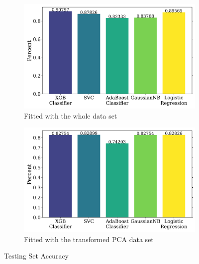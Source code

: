 \documentclass{article}
\begin{document}
\begin{figure}[H]
    \centering
    \begin{subfigure}[t]{0.495\textwidth}
        \centering
        \includegraphics[width=\textwidth]{supporting_images/test_acc_notpca.png}
        \caption{Fitted with the whole data set}
        \label{fig:test_acc_notpca}
    \end{subfigure}
    \hfill
    \begin{subfigure}[t]{0.495\textwidth}
        \centering
        \includegraphics[width=\textwidth]{supporting_images/test_acc_pca.png}
        \caption{Fitted with the transformed PCA data set}
        \label{fig:test_acc_pca}
    \end{subfigure}
    \caption{Testing Set Accuracy}
    \label{fig:test_acc}
\end{figure}
\end{document}
